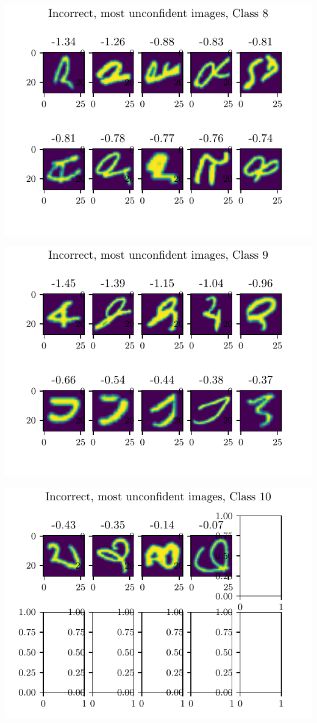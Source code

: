 \documentclass[11pt]{article}
\begin{document}
\includegraphics{figures/2d_unconfident_imgs_class_8.pdf}

\includegraphics{figures/2d_unconfident_imgs_class_9.pdf}

\includegraphics{figures/2d_unconfident_imgs_class_10.pdf}
\end{document}
